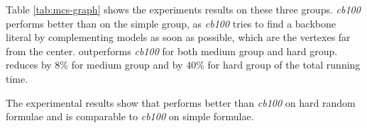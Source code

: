 Table \ref{tab:mcs-graph} shows the experiments results on these three groups. \textit{cb100} performs better than \tool on the simple group, as \textit{cb100} tries to find a backbone literal by complementing models as soon as possible, which are the vertexes far from the center.
\tool outperforms \textit{cb100} for both medium group and hard group.
\tool reduces by 8\% for medium group and by 40\% for hard group of the total running time.





The experimental results show that \tool performs better than \textit{cb100} on hard random formulae and is comparable to \textit{cb100} on simple formulae.




